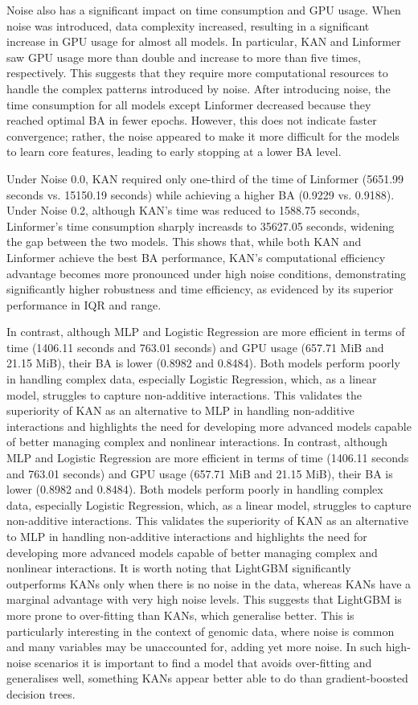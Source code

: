 \documentclass{article}
\begin{document}
Noise also has a significant impact on time consumption and GPU usage. When noise was introduced, data complexity increased, resulting in a significant increase in GPU usage for almost all models. In particular, KAN and Linformer saw GPU usage more than double and increase to more than five times, respectively. This suggests that they require more computational resources to handle the complex patterns introduced by noise. After introducing noise, the time consumption for all models except Linformer decreased because they reached optimal BA in fewer epochs. However, this does not indicate faster convergence; rather, the noise appeared to make it more difficult for the models to learn core features, leading to early stopping at a lower BA level.

Under Noise 0.0, KAN required only one-third of the time of Linformer (5651.99 seconds vs. 15150.19 seconds) while achieving a higher BA (0.9229 vs. 0.9188). Under Noise 0.2, although KAN's time was reduced to 1588.75 seconds, Linformer's time consumption sharply increasds to 35627.05 seconds, widening the gap between the two models. This shows that, while both KAN and Linformer achieve the best BA performance, KAN's computational efficiency advantage becomes more pronounced under high noise conditions, demonstrating significantly higher robustness and time efficiency, as evidenced by its superior performance in IQR and range. 

In contrast, although MLP and Logistic Regression are more efficient in terms of time (1406.11 seconds and 763.01 seconds) and GPU usage (657.71 MiB and 21.15 MiB), their BA is lower (0.8982 and 0.8484). Both models perform poorly in handling complex data, especially Logistic Regression, which, as a linear model, struggles to capture non-additive interactions. This validates the superiority of KAN as an alternative to MLP in handling non-additive interactions and highlights the need for developing more advanced models capable of better managing complex and nonlinear interactions. 
In contrast, although MLP and Logistic Regression are more efficient in terms of time (1406.11 seconds and 763.01 seconds) and GPU usage (657.71 MiB and 21.15 MiB), their BA is lower (0.8982 and 0.8484). Both models perform poorly in handling complex data, especially Logistic Regression, which, as a linear model, struggles to capture non-additive interactions. This validates the superiority of KAN as an alternative to MLP in handling non-additive interactions and highlights the need for developing more advanced models capable of better managing complex and nonlinear interactions.
It is worth noting that LightGBM significantly outperforms KANs only when there is no noise in the data, whereas KANs have a marginal advantage with very high noise levels.
This suggests that LightGBM is more prone to over-fitting than KANs, which generalise better.
This is particularly interesting in the context of genomic data, where noise is common and many variables may be unaccounted for, adding yet more noise.
In such high-noise scenarios it is important to find a model that avoids over-fitting and generalises well, something KANs appear better able to do than gradient-boosted decision trees.
\end{document}
